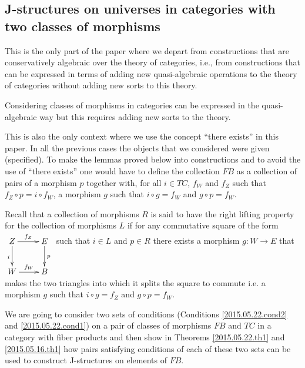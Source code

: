 \documentclass[12pt]{article}
\numberwithin{equation}{section}
\newcommand{\sr}{\rightarrow}
\begin{document}
\subsection{J-structures on universes in categories with two classes of morphisms}
%
%
This is the only part of the paper where we depart from constructions that are
conservatively algebraic over the theory of categories, i.e., from
constructions that can be expressed in terms of adding new quasi-algebraic
operations to the theory of categories without adding new sorts to this theory.

Considering classes of morphisms in categories can be expressed in the
quasi-algebraic way but this requires adding new sorts to the theory.

This is also the only context where we use the concept ``there exists'' in this
paper. In all the previous cases the objects that we considered were given
(specified). To make the lemmas proved below into constructions and to avoid
the use of ``there exists'' one would have to define the collection $FB$ as a
collection of pairs of a morphism $p$ together with, for all $i\in TC$, $f_W$
and $f_Z$ such that $f_Z\circ p=i\circ f_W$, a morphism $g$ such that $i\circ
g=f_W$ and $g\circ p=f_W$.

Recall that a collection of morphisms $R$ is said to have the right lifting
property for the collection of morphisms $L$ if for any commutative square of
the form
%
$
\begin{xy}
          \xymatrix@C=2pc{ Z \ar[r]^-{f_Z} \ar[d]_{i} & E \ar[d]^{p}\\ W
            \ar[r]^-{f_W} & B }
\end{xy}
$
%
such that $i\in L$ and $p\in R$ there exists a morphism $g:W\sr E$ that makes
the two triangles into which it splits the square to commute i.e. a morphism
$g$ such that $i\circ g=f_Z$ and $g\circ p=f_W$.
%

We are going to consider two sets of conditions (Conditions
\ref{2015.05.22.cond2} and \ref{2015.05.22.cond1}) on a pair of classes of
morphisms $FB$ and $TC$ in a category with fiber products and then show in
Theorems \ref{2015.05.22.th1} and \ref{2015.05.16.th1} how pairs satisfying
conditions of each of these two sets can be used to construct J-structures on
elements of $FB$.
\end{document}
